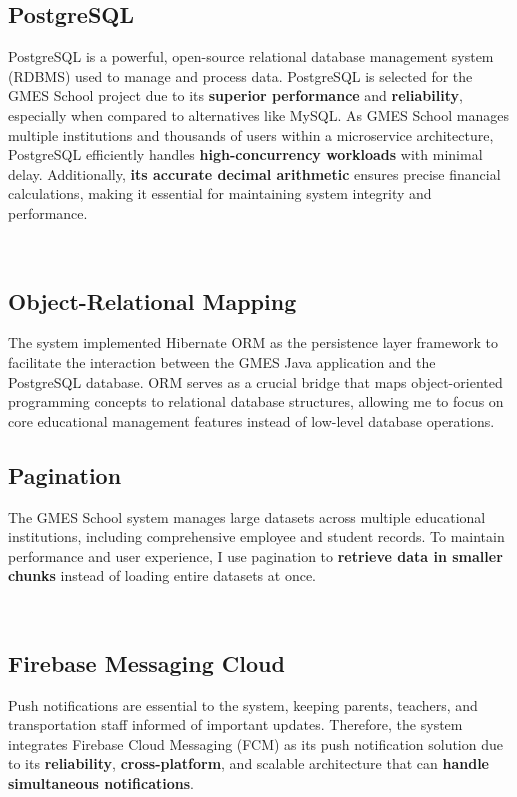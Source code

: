 \subsection{PostgreSQL}
\begin{minipage}{\textwidth}
    \setlength{\parindent}{2em}
    PostgreSQL is a powerful, open-source relational database management system (RDBMS) used to manage and process data. PostgreSQL is selected for the GMES School project due to its \textbf{superior performance} and \textbf{reliability}, especially when compared to alternatives like MySQL. As GMES School manages multiple institutions and thousands of users within a microservice architecture, PostgreSQL efficiently handles \textbf{high-concurrency workloads} with minimal delay. Additionally, \textbf{its accurate decimal arithmetic} ensures precise financial calculations, making it essential for maintaining system integrity and performance.
\end{minipage}\\

\subsection{Object-Relational Mapping}
\indent\indent The system implemented Hibernate ORM as the persistence layer framework to facilitate the interaction between the GMES Java application and the PostgreSQL database. ORM serves as a crucial bridge that maps object-oriented programming concepts to relational database structures, allowing me to focus on core educational management features instead of low-level database operations.

\subsection{Pagination}
\begin{minipage}{\textwidth}
    \setlength{\parindent}{2em}
    The GMES School system manages large datasets across multiple educational institutions, including comprehensive employee and student records. To maintain performance and user experience, I use pagination to \textbf{retrieve data in smaller chunks} instead of loading entire datasets at once.
\end{minipage}\\


\subsection{Firebase Messaging Cloud}
\begin{minipage}{\textwidth}
    \setlength{\parindent}{2em} Push notifications are essential to the system, keeping parents, teachers, and transportation staff informed of important updates. Therefore, the system integrates Firebase Cloud Messaging (FCM) as its push notification solution due to its \textbf{reliability}, \textbf{cross-platform}, and scalable architecture that can \textbf{handle simultaneous notifications}.
\end{minipage}\\

